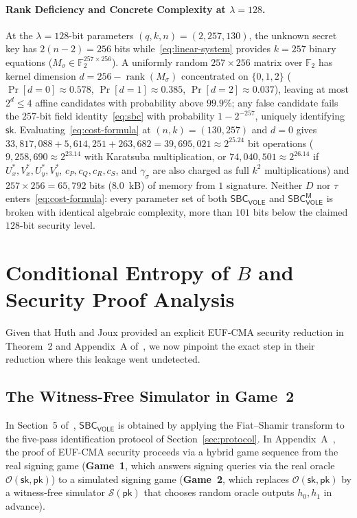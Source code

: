 \documentclass[11pt,a4paper]{article}
\theoremstyle{definition}
\theoremstyle{remark}
\newcommand{\Ftwo}{\mathbb{F}_2}
\newcommand{\SBCVOLE}{\mathsf{SBC}_{\mathsf{VOLE}}}
\newcommand{\SBCVOLEM}{\mathsf{SBC}_{\mathsf{VOLE}}^{\mathsf{M}}}
\newcommand{\pk}{\mathsf{pk}}
\newcommand{\sk}{\mathsf{sk}}
\newcommand{\rank}{\operatorname{rank}}
\begin{document}
\paragraph{Rank Deficiency and Concrete Complexity at $\lambda = 128$.}
At the $\lambda = 128$-bit parameters $(q, k, n) = (2, 257, 130)$, the unknown secret key has $2(n-2) = 256$ bits while~\eqref{eq:linear-system} provides $k = 257$ binary equations ($M_\sigma \in \Ftwo^{257 \times 256}$). A uniformly random $257 \times 256$ matrix over $\Ftwo$ has kernel dimension $d = 256 - \rank(M_\sigma)$ concentrated on $\{0, 1, 2\}$ ($\Pr[d = 0] \approx 0.578$, $\Pr[d = 1] \approx 0.385$, $\Pr[d = 2] \approx 0.037$), leaving at most $2^d \le 4$ affine candidates with probability above $99.9\%$; any false candidate fails the $257$-bit field identity~\eqref{eq:sbc} with probability $1 - 2^{-257}$, uniquely identifying $\sk$. Evaluating~\eqref{eq:cost-formula} at $(n, k) = (130, 257)$ and $d = 0$ gives $33{,}817{,}088 + 5{,}614{,}251 + 263{,}682 = 39{,}695{,}021 \approx 2^{25.24}$ bit operations ($9{,}258{,}690 \approx 2^{23.14}$ with Karatsuba multiplication, or $74{,}040{,}501 \approx 2^{26.14}$ if $U_x^*, V_x^*, U_y^*, V_y^*$, $c_P, c_Q, c_R, c_S$, and $\gamma_\sigma$ are also charged as full $k^2$ multiplications) and $257 \times 256 = 65{,}792$ bits ($8.0$~kB) of memory from $1$ signature. Neither $D$ nor $\tau$ enters~\eqref{eq:cost-formula}: every parameter set of both $\SBCVOLE$ and $\SBCVOLEM$ is broken with identical algebraic complexity, more than $101$ bits below the claimed $128$-bit security level.

\section{Conditional Entropy of \texorpdfstring{$B$}{B} and Security Proof Analysis}
\label{sec:proof-flaw}

Given that Huth and Joux provided an explicit EUF-CMA security reduction in Theorem~2 and Appendix~A of~\cite{HJ25}, we now pinpoint the exact step in their reduction where this leakage went undetected.

\subsection{The Witness-Free Simulator in Game~2}
In Section~5 of~\cite[p.~18, full version]{HJ25}, $\SBCVOLE$ is obtained by applying the Fiat--Shamir transform to the five-pass identification protocol of Section~\ref{sec:protocol}. In Appendix~A~\cite[pp.~33--35, full version]{HJ25}, the proof of EUF-CMA security proceeds via a hybrid game sequence from the real signing game (\textbf{Game~1}, which answers signing queries via the real oracle $\mathcal{O}(\sk, \pk)$) to a simulated signing game (\textbf{Game~2}, which replaces $\mathcal{O}(\sk, \pk)$ by a witness-free simulator $\mathcal{S}(\pk)$ that chooses random oracle outputs $h_0, h_1$ in advance).
\end{document}
